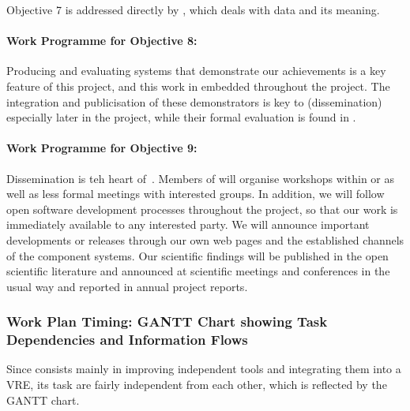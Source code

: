 \documentclass[noworkareas,deliverables,\classoptions]{euproposal}       %
\begin{document}
\begin{proposal}
Objective 7 is addressed directly by , which deals with data
and its meaning.

\paragraph{Work Programme for Objective 8: }

Producing and evaluating systems that demonstrate our achievements is
a key feature of this project, and this work in embedded throughout
the project. The integration and publicisation of these demonstrators
is key to  (dissemination) especially later in the
project, while their formal evaluation is found in .

\paragraph{Work Programme for Objective 9: }

Dissemination is teh heart of~.
Members of \TheProject will organise workshops within 
or  as well as less formal meetings
with interested groups. In addition, we will follow open software development
processes throughout the project, so that our work is immediately
available to any interested party. We will announce important
developments or releases through our own web pages and the
established channels of the component systems. Our scientific findings
will be published in the open scientific literature and announced at
scientific meetings and conferences in the usual way and reported in
annual project reports.


\subsubsection{Work Plan Timing: GANTT Chart showing Task Dependencies and Information Flows}

Since \TheProject consists mainly in improving independent tools and
integrating them into a VRE, its task are fairly independent from each
other, which is reflected by the GANTT chart.



\gantttaskchart[draft,xscale=.33,yscale=.26,milestones] 

\newpage

\end{proposal}
\end{document}
